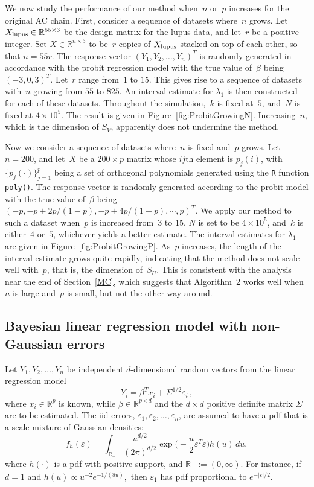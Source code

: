 \documentclass[11pt]{article}
\begin{document}
	We now study the performance of our method when~$n$ or~$p$ increases for the original AC chain.
	First, consider a sequence of datasets where~$n$ grows.
	Let $X_{\scriptsize\mbox{lupus}} \in \mathbb{R}^{55 \times 3}$ be the design matrix for the lupus data, and let~$r$ be a positive integer.
	Set $X \in \mathbb{R}^{n \times 3}$ to be~$r$ copies of $X_{\scriptsize\mbox{lupus}}$ stacked on top of each other, so that $n=55r$.
	The response vector $(Y_1,Y_2,\dots,Y_n)^T$ is randomly generated in accordance with the probit regression model with the true value of~$\beta$ being $(-3,0,3)^T$.
	Let~$r$ range from~$1$ to $15$.
	This gives rise to a sequence of datasets with~$n$ growing from $55$ to $825$.
	An interval estimate for $\lambda_1$ is then constructed for each of these datasets.
	Throughout the simulation,~$k$ is fixed at~$5$, and~$N$ is fixed at $4 \times 10^5$.
	The result is given in Figure~\ref{fig:ProbitGrowingN}.
	Increasing~$n$, which is the dimension of $S_V$, apparently does not undermine the method.
	
	Now we consider a sequence of datasets where~$n$ is fixed and~$p$ grows.
	Let $n=200$, and let~$X$ be a $200 \times p$ matrix whose $ij$th element is $p_j(i)$, with $\{p_j(\cdot)\}_{j=1}^p$ being a set of orthogonal polynomials generated using the \verb|R| function \verb|poly()|.
	The response vector is randomly generated according to the probit model with the true value of~$\beta$ being $(-p, -p+2p/(1-p), -p + 4p/(1-p), \cdots, p)^T$.
	We apply our method to such a dataset when~$p$ is increased from~$3$ to $15$. 
	$N$ is set to be $4\times 10^5$, and~$k$ is either~$4$ or~$5$, whichever yields a better estimate.
	The interval estimates for $\lambda_1$ are given in Figure~\ref{fig:ProbitGrowingP}.
	As~$p$ increases, the length of the interval estimate grows quite rapidly, indicating that the method does not scale well with~$p$, that is, the dimension of~$S_U$.
	This is consistent with the analysis near the end of Section~\ref{MC}, which suggests that Algorithm~2 works well when~$n$ is large and~$p$ is small, but not the other way around.
	
	
	
	\subsection{Bayesian linear regression model with non-Gaussian errors}
	
	Let $Y_1,Y_2,\dots,Y_n$ be independent $d$-dimensional random
	vectors from the linear regression model
	\[
	Y_i = \beta^T x_i + \Sigma^{1/2}\varepsilon_i \,,
	\]
	where $x_i \in \mathbb{R}^{p}$ is known, while $\beta \in
	\mathbb{R}^{p \times d}$ and the $d\times d$ positive definite
	matrix $\Sigma$ are to be estimated.  The iid errors,
	$\varepsilon_1,\varepsilon_2,\dots,\varepsilon_n$, are assumed
	to have a pdf that is a scale mixture of Gaussian densities:
	\[
	f_h(\varepsilon) = \int_{\mathbb{R}_+} \frac{u^{d/2}}{(2\pi)^{d/2}} \exp \Big( -\frac{u}{2} \varepsilon^T\varepsilon \Big) h(u) \, du,
	\]
	where $h(\cdot)$ is a pdf with positive support, and
	$\mathbb{R}_+ := (0,\infty).$ For instance, if $d=1$ and $h(u)
	\propto u^{-2}e^{-1/(8u)},$ then $\varepsilon_1$ has pdf
	proportional to $e^{-|\varepsilon|/2}.$
	
\end{document}
